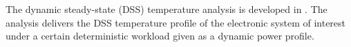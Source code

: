 The dynamic steady-state (DSS) temperature analysis is developed in \cite{ukhov2012}.
The analysis delivers the DSS temperature profile of the electronic system of interest under a certain deterministic workload given as a dynamic power profile.
